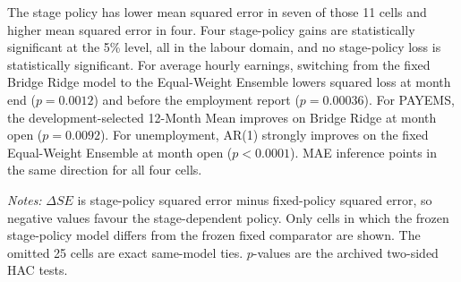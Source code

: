 The stage policy has lower mean squared error in seven of those 11 cells and
higher mean squared error in four.  Four stage-policy gains are statistically
significant at the 5\% level, all in the labour domain, and no stage-policy
loss is statistically significant.  For average hourly earnings, switching
from the fixed Bridge Ridge model to the Equal-Weight Ensemble lowers squared
loss at month end (\(p=0.0012\)) and before the employment report
(\(p=0.00036\)).  For PAYEMS, the development-selected 12-Month Mean improves
on Bridge Ridge at month open (\(p=0.0092\)).  For unemployment, AR(1)
strongly improves on the fixed Equal-Weight Ensemble at month open
(\(p<0.0001\)).  MAE inference points in the same direction for all four
cells.

\begin{table}[H]
\centering
\caption{H2: informative stage-policy comparisons where the frozen models differ}
\label{tab:h2_stage_policy}
\scriptsize
\setlength{\tabcolsep}{3.0pt}
\par\medskip
\begin{minipage}{0.94\textwidth}
\footnotesize
\textit{Notes:} \(\Delta SE\) is stage-policy squared error minus fixed-policy
squared error, so negative values favour the stage-dependent policy.  Only
cells in which the frozen stage-policy model differs from the frozen fixed
comparator are shown.  The omitted 25 cells are exact same-model ties.
\(p\)-values are the archived two-sided HAC tests.
\end{minipage}
\end{table}


